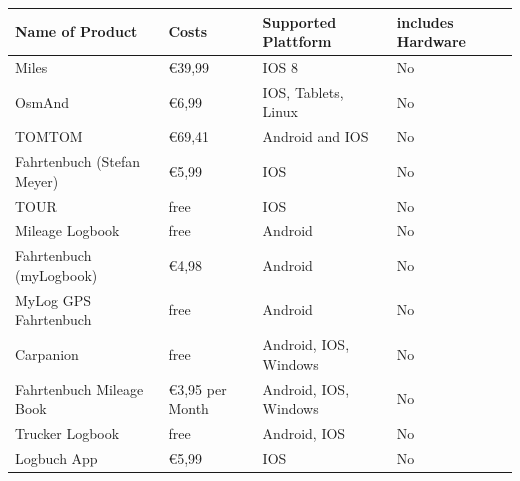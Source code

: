 \begin{singlespace}
\begin{tabular}{p{3cm}p{5cm}p{3cm}p{2cm}}
  \textbf{Name of \newline Product} & \textbf{Costs} & \textbf{Supported Plattform} & \textbf{includes Hardware} \\
\midrule
  Miles                      & \euro 39,99                                                                                                 & IOS 8                 & No  \\ 
OsmAnd                     & \euro 6,99                                                                                                  & IOS, Tablets, Linux   & No  \\ 
TOMTOM                     & \euro 69,41                                                                                                 & Android and IOS       & No  \\ 
Fahrtenbuch (Stefan Meyer) & \euro 5,99                                                                                                  & IOS                   & No  \\ 
TOUR                       & free                                                                                                        & IOS                   & No  \\ 
Mileage Logbook            & free                                                                                                        & Android               & No  \\ 
Fahrtenbuch (myLogbook)    & \euro 4,98                                                                                                  & Android               & No  \\ 
MyLog GPS Fahrtenbuch      & free                                                                                                        & Android               & No  \\ 
Carpanion                  & free                                                                                                        & Android, IOS, Windows & No  \\ 
Fahrtenbuch Mileage Book   & \euro 3,95 per Month                                                                                        & Android, IOS, Windows & No  \\ 
Trucker Logbook            & free                                                                                                        & Android, IOS          & No  \\ 
Logbuch App                & \euro 5,99                                                                                                  & IOS                   & No  \\ 

\end{tabular}
\end{singlespace}
